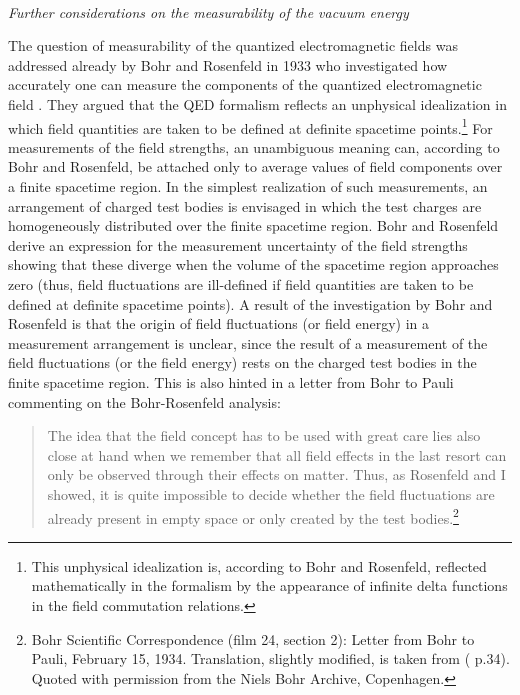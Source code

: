 \documentclass[12pt]{article}
\begin{document}
\ \\
{\em Further considerations on the measurability of the vacuum energy}

The question of measurability of the quantized electromagnetic fields
was addressed already by Bohr and Rosenfeld in 1933 who investigated
how accurately one can measure the components of the quantized
electromagnetic field \cite{bohr33}. They argued that the QED
formalism reflects an unphysical idealization in which field
quantities are taken to be defined at definite spacetime
points.\footnote{This unphysical idealization is, according to Bohr
and Rosenfeld, reflected mathematically in the formalism by the
appearance of infinite delta functions in the field commutation
relations.}  For measurements of the field strengths, an unambiguous
meaning can, according to Bohr and Rosenfeld, be attached only to
average values of field components over a finite spacetime region.
In the simplest realization of such measurements, an arrangement of
charged test bodies is envisaged in which the test charges are
homogeneously distributed over the finite spacetime region.  Bohr and
Rosenfeld derive an expression for the measurement uncertainty of the
field strengths showing that these diverge when the volume of the
spacetime region approaches zero (thus, field fluctuations are
ill-defined if field quantities are taken to be defined at definite
spacetime points).  A result of the investigation by Bohr and
Rosenfeld is that the origin of field fluctuations (or field energy)
in a measurement arrangement is unclear, since the result of a
measurement of the field fluctuations (or the field energy) rests on
the charged test bodies in the finite spacetime region. This is also
hinted in a letter from Bohr to Pauli commenting on the Bohr-Rosenfeld
analysis:

\begin{quote}
The idea that the field concept has to be used with
great care lies also close at hand when we remember that all field
effects in the last resort can only be observed through their effects
on matter. Thus, as Rosenfeld and I showed, it is quite impossible
to decide whether the field fluctuations are already present in 
empty space or only created by the test 
bodies.\footnote{Bohr Scientific Correspondence (film 24, section 2):
Letter from Bohr to Pauli, February 15, 1934. Translation, slightly 
modified, is taken from (\cite{kalckar96} p.34). Quoted with permission
from the Niels Bohr Archive, Copenhagen.}
\end{quote}
\end{document}
